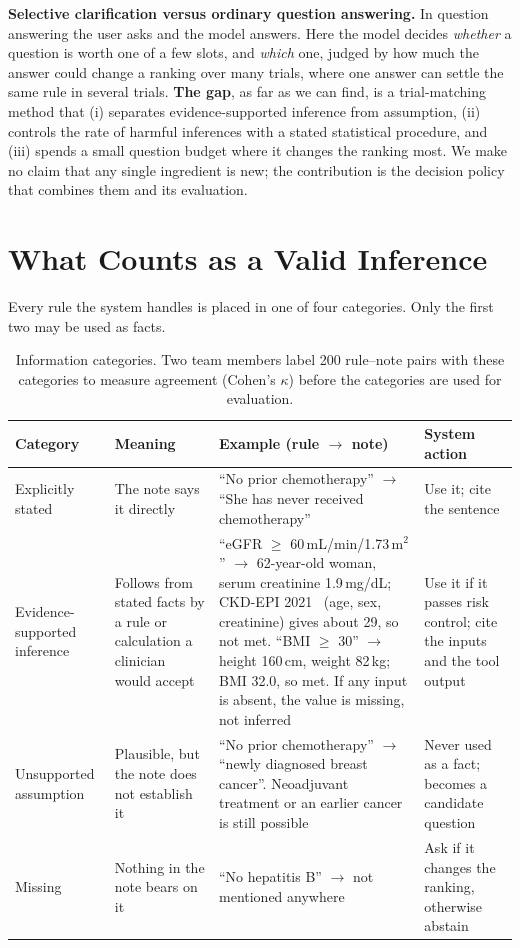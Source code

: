 \documentclass[10pt,a4paper]{article}
\begin{document}
\textbf{Selective clarification versus ordinary question answering.} In question answering the user asks and the model answers. Here the model decides \emph{whether} a question is worth one of a few slots, and \emph{which} one, judged by how much the answer could change a ranking over many trials, where one answer can settle the same rule in several trials. \textbf{The gap}, as far as we can find, is a trial-matching method that (i) separates evidence-supported inference from assumption, (ii) controls the rate of harmful inferences with a stated statistical procedure, and (iii) spends a small question budget where it changes the ranking most. We make no claim that any single ingredient is new; the contribution is the decision policy that combines them and its evaluation.

\section{What Counts as a Valid Inference}
Every rule the system handles is placed in one of four categories. Only the first two may be used as facts.

\begin{table}[H]
\centering\footnotesize
\begin{tabularx}{\textwidth}{@{}P{2.4cm}P{3.6cm}LP{2.6cm}@{}}
\toprule
\textbf{Category} & \textbf{Meaning} & \textbf{Example (rule \(\to\) note)} & \textbf{System action}\\
\midrule
Explicitly stated & The note says it directly & ``No prior chemotherapy'' \(\to\) ``She has never received chemotherapy'' & Use it; cite the sentence\\
Evidence-supported inference & Follows from stated facts by a rule or calculation a clinician would accept & ``eGFR \(\ge\) 60\,mL/min/1.73\,m\(^2\)'' \(\to\) 62-year-old woman, serum creatinine 1.9\,mg/dL; CKD-EPI 2021~\cite{ckdepi} (age, sex, creatinine) gives about 29, so not met. ``BMI \(\ge\) 30'' \(\to\) height 160\,cm, weight 82\,kg; BMI 32.0, so met. If any input is absent, the value is missing, not inferred & Use it if it passes risk control; cite the inputs and the tool output\\
Unsupported assumption & Plausible, but the note does not establish it & ``No prior chemotherapy'' \(\to\) ``newly diagnosed breast cancer''. Neoadjuvant treatment or an earlier cancer is still possible & Never used as a fact; becomes a candidate question\\
Missing & Nothing in the note bears on it & ``No hepatitis B'' \(\to\) not mentioned anywhere & Ask if it changes the ranking, otherwise abstain\\
\bottomrule
\end{tabularx}
\caption{Information categories. Two team members label 200 rule--note pairs with these categories to measure agreement (Cohen's \(\kappa\)) before the categories are used for evaluation.}
\label{tab:cat}
\end{table}
\end{document}
